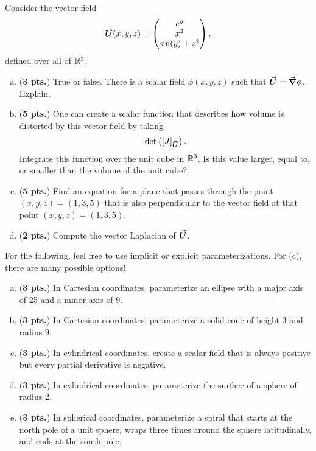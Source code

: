 \documentclass[12pt]{amsbook}
\begin{document}
\newpage
\begin{problem}
    Consider the vector field
    \[
    \boldsymbol{\vec{U}}(x,y,z) = \begin{pmatrix} e^y \\ x^2 \\ \sin(y)+z^2 \end{pmatrix}.
    \]
    defined over all of $\mathbb{R}^3$. 
    \begin{enumerate}[(a)]
        \item (\textbf{3 pts.}) True or false.  There is a scalar field $\phi(x,y,z)$ such that $\boldsymbol{\vec{U}}=\boldsymbol{\vec{\nabla}} \phi$. Explain.
                \vspace*{.25cm}
        \item (\textbf{5 pts.}) One can create a scalar function that describes how volume is distorted by this vector field by taking
        \[
        \det \left( [J]_{\boldsymbol{\vec{U}}}\right).
        \]
        Integrate this function over the unit cube in $\mathbb{R}^3$.  Is this value larger, equal to, or smaller than the volume of the unit cube?
                \vspace*{.25cm}
        \item (\textbf{5 pts.}) Find an equation for a plane that passes through the point $(x,y,z)=(1,3,5)$ that is also perpendicular to the vector field at that point $(x,y,z)=(1,3,5)$.
        \vspace*{.25cm}
        \item (\textbf{2 pts.}) Compute the vector Laplacian of $\boldsymbol{\vec{U}}$.
    \end{enumerate}
\end{problem}

\newpage
\begin{problem} For the following, feel free to use implicit or explicit parameterizations.  For (c), there are many possible options!
    \begin{enumerate}[(a)]
        \item (\textbf{3 pts.}) In Cartesian coordinates, parameterize an ellipse with a major axis of 25 and a minor axis of 9.
        \vspace*{.25cm}
        \item (\textbf{3 pts.}) In Cartesian coordinates, parameterize a solid cone of height 3 and radius 9.
        \vspace*{.25cm}
        \item (\textbf{3 pts.}) In cylindrical coordinates, create a scalar field that is always positive but every partial derivative is negative.
        \vspace*{.25cm}
        \item (\textbf{3 pts.}) In cylindrical coordinates, parameterize the surface of a sphere of radius 2.
        \vspace*{.25cm}
        \item (\textbf{3 pts.}) In spherical coordinates, parameterize a spiral that starts at the north pole of a unit sphere, wraps three times around the sphere latitudinally, and ends at the south pole.
    \end{enumerate}
\end{problem}
\end{document}

